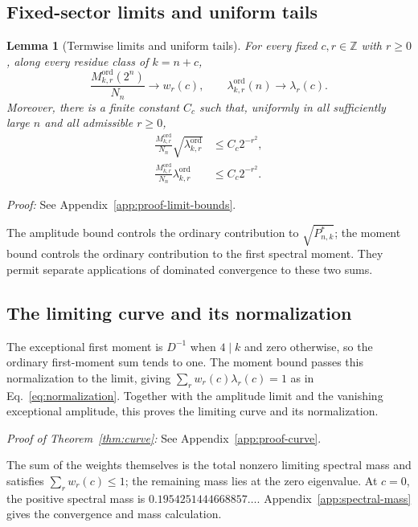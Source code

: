 \documentclass[journal,twocolumn]{IEEEtran}
\newtheorem{lemma}[theorem]{Lemma}
\theoremstyle{definition}
\theoremstyle{plain}
\newcommand{\Ord}{\mathrm{ord}}
\begin{document}
\subsection{Fixed-sector limits and uniform tails}
\begin{lemma}[Termwise limits and uniform tails]
\label{lemS:limit-bounds}
For every fixed $c,r\in\mathbb Z$ with $r\geq0$, along every residue class
of $k=n+c$,
\begin{equation}
 \frac{M^{\Ord}_{k,r}(2^n)}{N_n}\longrightarrow w_r(c),
 \qquad
 \lambda^{\Ord}_{k,r}(n)\longrightarrow\lambda_r(c).
 \label{eqS:termwise-limit}
\end{equation}
Moreover, there is a finite constant $C_c$ such that, uniformly in all
sufficiently large $n$ and all admissible $r\geq0$,
\begin{align}
 \frac{M^{\Ord}_{k,r}}{N_n}\sqrt{\lambda^{\Ord}_{k,r}}
 &\leq C_c2^{-r^2},
 \label{eqS:amplitude-majorant}\\
 \frac{M^{\Ord}_{k,r}}{N_n}\lambda^{\Ord}_{k,r}
 &\leq C_c2^{-r^2}.
 \label{eqS:moment-majorant}
\end{align}
\end{lemma}

\noindent\emph{Proof:} See Appendix~\ref{app:proof-limit-bounds}.\par

The amplitude bound controls the ordinary contribution to
$\sqrt{P^*_{n,k}}$; the moment bound controls the ordinary contribution
to the first spectral moment.  They permit
separate applications of dominated convergence to these two sums.

\subsection{The limiting curve and its normalization}
The exceptional first moment is $D^{-1}$ when $4\mid k$ and zero
otherwise, so the ordinary first-moment sum tends to one.  The moment
bound passes this normalization to the limit, giving
$\sum_rw_r(c)\lambda_r(c)=1$ as in Eq.~\eqref{eq:normalization}.
Together with the amplitude limit and the vanishing exceptional
amplitude, this proves the limiting curve and its normalization.

\noindent\emph{Proof of Theorem~\ref{thm:curve}:} See Appendix~\ref{app:proof-curve}.\par

The sum of the weights themselves is the total nonzero limiting
spectral mass and satisfies $\sum_r w_r(c)\leq1$; the remaining mass lies
at the zero eigenvalue.  At $c=0$, the positive spectral mass is
$0.1954251444668857\ldots$.  Appendix~\ref{app:spectral-mass}
gives the convergence and mass calculation.
\end{document}
